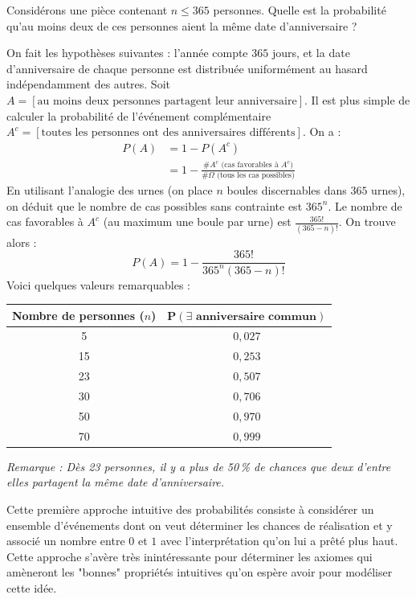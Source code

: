 \begin{exemple}
    Considérons une pièce contenant $n \le 365$ personnes. Quelle est la probabilité qu'au moins deux de ces personnes aient la même date d'anniversaire ?
    
    On fait les hypothèses suivantes : l'année compte $365$ jours, et la date d'anniversaire de chaque personne est distribuée uniformément au hasard indépendamment des autres. Soit $A = [\text{au moins deux personnes partagent leur anniversaire}]$. Il est plus simple de calculer la probabilité de l'événement complémentaire $A^c = [\text{toutes les personnes ont des anniversaires différents}]$. On a :
    \begin{align*}
        P(A) &= 1 - P(A^c) \\
        &= 1 - \frac{\# A^c \text{ (cas favorables à } A^c)}{\# \Omega \text{ (tous les cas possibles)}}
    \end{align*}
    En utilisant l'analogie des urnes (on place $n$ boules discernables dans $365$ urnes), on déduit que le nombre de cas possibles sans contrainte est $365^n$. Le nombre de cas favorables à $A^c$ (au maximum une boule par urne) est $\frac{365!}{(365-n)!}$. On trouve alors :
    \[
    P(A) = 1 - \frac{365!}{365^n (365-n)!}
    \]
    Voici quelques valeurs remarquables :
    \begin{center}
    \begin{tabular}{|c|c|}
       \hline
       \textbf{Nombre de personnes} ($n$) & $\boldsymbol{P(\exists \text{ anniversaire commun})}$ \\
       \hline
       5  & $0{,}027$ \\
       15 & $0{,}253$ \\
       23 & $0{,}507$ \\
       30 & $0{,}706$ \\
       50 & $0{,}970$ \\
       70 & $0{,}999$ \\
       \hline
    \end{tabular}
    \end{center}
    \textit{Remarque : Dès 23 personnes, il y a plus de 50\,\% de chances que deux d'entre elles partagent la même date d'anniversaire.}
\end{exemple}

Cette première approche intuitive des probabilités consiste à considérer un ensemble d’événements dont on veut déterminer les chances de réalisation et y associé un nombre entre $0$ et $1$ avec l'interprétation qu'on lui a prêté plus haut. Cette approche s'avère très inintéressante pour déterminer les axiomes qui amèneront les "bonnes" propriétés intuitives qu'on espère avoir pour modéliser cette idée.


